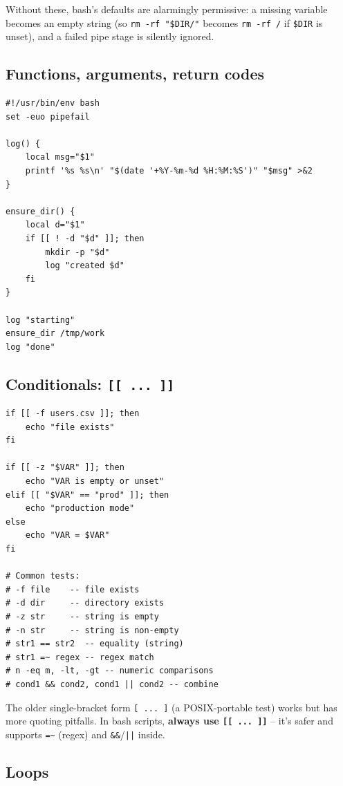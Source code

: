 \documentclass[11pt,a4paper]{article}
\begin{document}
Without these, bash's defaults are alarmingly permissive: a missing
variable becomes an empty string (so \texttt{rm -rf "\$DIR/"} becomes
\texttt{rm -rf /} if \texttt{\$DIR} is unset), and a failed pipe stage
is silently ignored.

\subsection*{Functions, arguments, return codes}

\begin{lstlisting}[style=bashstyle]
#!/usr/bin/env bash
set -euo pipefail

log() {
    local msg="$1"
    printf '%s %s\n' "$(date '+%Y-%m-%d %H:%M:%S')" "$msg" >&2
}

ensure_dir() {
    local d="$1"
    if [[ ! -d "$d" ]]; then
        mkdir -p "$d"
        log "created $d"
    fi
}

log "starting"
ensure_dir /tmp/work
log "done"
\end{lstlisting}

\subsection*{Conditionals: \texttt{[[ ... ]]}}

\begin{lstlisting}[style=bashstyle]
if [[ -f users.csv ]]; then
    echo "file exists"
fi

if [[ -z "$VAR" ]]; then
    echo "VAR is empty or unset"
elif [[ "$VAR" == "prod" ]]; then
    echo "production mode"
else
    echo "VAR = $VAR"
fi

# Common tests:
# -f file    -- file exists
# -d dir     -- directory exists
# -z str     -- string is empty
# -n str     -- string is non-empty
# str1 == str2  -- equality (string)
# str1 =~ regex -- regex match
# n -eq m, -lt, -gt -- numeric comparisons
# cond1 && cond2, cond1 || cond2 -- combine
\end{lstlisting}

\begin{gotcha}
The older single-bracket form \texttt{[ ... ]} (a POSIX-portable
test) works but has more quoting pitfalls. In bash scripts,
\textbf{always use \texttt{[[ ... ]]}} -- it's safer and supports
\texttt{=\textasciitilde{}} (regex) and \texttt{\&\&}/\texttt{||}
inside.
\end{gotcha}

\subsection*{Loops}
\end{document}
